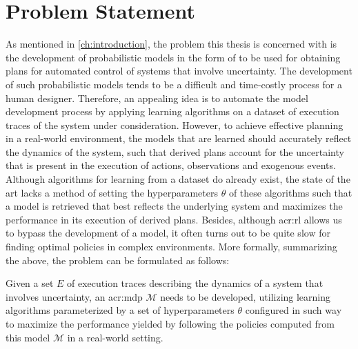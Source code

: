 \section{Problem Statement}
\label{sec:problem-statement}

As mentioned in \autoref{ch:introduction}, the problem this thesis is concerned with is the development of probabilistic models in the form of  to be used for obtaining plans for automated control of systems that involve uncertainty.
The development of such probabilistic models tends to be a difficult and time-costly process for a human designer.
Therefore, an appealing idea is to automate the model development process by applying learning algorithms on a dataset of execution traces of the system under consideration.
However, to achieve effective planning in a real-world environment, the models that are learned should accurately reflect the dynamics of the system, such that derived plans account for the uncertainty that is present in the execution of actions, observations and exogenous events.
Although algorithms for learning  from a dataset do already exist, the state of the art lacks a method of setting the hyperparameters $\theta$ of these algorithms such that a model is retrieved that best reflects the underlying system and maximizes the performance in its execution of derived plans.
Besides, although \acrfull{acr:rl} allows us to bypass the development of a model, it often turns out to be quite slow for finding optimal policies in complex environments.
More formally, summarizing the above, the problem can be formulated as follows:

\begin{problem}
	Given a set $E$ of execution traces describing the dynamics of a system that involves uncertainty, an \acrshort{acr:mdp} $\mathcal{M}$ needs to be developed, utilizing learning algorithms parameterized by a set of hyperparameters $\theta$ configured in such way to maximize the performance yielded by following the policies computed from this model $\mathcal{M}$ in a real-world setting.
\end{problem}


